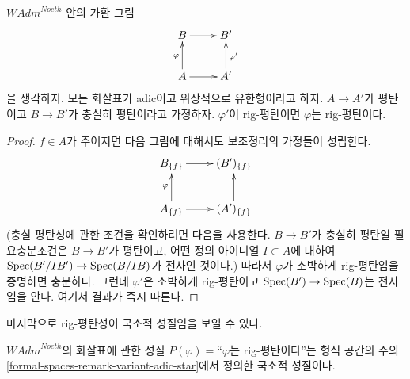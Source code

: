 \begin{lemma}
\label{lemma-rig-flat-local-down}
$\textit{WAdm}^{Noeth}$ 안의 가환 그림
$$
\xymatrix{
B \ar[r] & B' \\
A \ar[r] \ar[u]^\varphi & A' \ar[u]_{\varphi'}
}
$$
을 생각하자. 모든 화살표가 adic이고 위상적으로 유한형이라고 하자.
$A \to A'$가 평탄이고 $B \to B'$가 충실히 평탄이라고 가정하자.
$\varphi'$이 rig-평탄이면 $\varphi$는 rig-평탄이다.
\end{lemma}

\begin{proof}
$f \in A$가 주어지면 다음 그림에 대해서도 보조정리의 가정들이 성립한다.
$$
\xymatrix{
B_{\{f\}} \ar[r] & (B')_{\{f\}} \\
A_{\{f\}} \ar[r] \ar[u]^\varphi & (A')_{\{f\}} \ar[u]
}
$$
(충실 평탄성에 관한 조건을 확인하려면 다음을 사용한다.
$B \to B'$가 충실히 평탄일 필요충분조건은 $B \to B'$가 평탄이고,
어떤 정의 아이디얼 $I \subset A$에 대하여
$\mathop{\mathrm{Spec}}(B'/IB') \to \mathop{\mathrm{Spec}}(B/IB)$가 전사인 것이다.)
따라서 $\varphi$가 소박하게 rig-평탄임을 증명하면 충분하다.
그런데 $\varphi'$은 소박하게 rig-평탄이고
$\mathop{\mathrm{Spec}}(B') \to \mathop{\mathrm{Spec}}(B)$는 전사임을 안다. 여기서 결과가 즉시 따른다.
\end{proof}

\noindent
마지막으로 rig-평탄성이 국소적 성질임을 보일 수 있다.

\begin{lemma}
\label{lemma-rig-flat-axioms}
$\textit{WAdm}^{Noeth}$의 화살표에 관한 성질
$P(\varphi)=$``$\varphi$는 rig-평탄이다''는 형식 공간의 주의
\ref{formal-spaces-remark-variant-adic-star}에서 정의한 국소적 성질이다.
\end{lemma}

